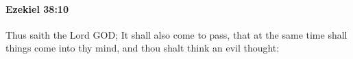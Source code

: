 
		\paragraph{Ezekiel 38:10} %
			\label{EZEKIEL-38-10}

			Thus saith the Lord GOD; It shall also come to pass, that at the same time shall things come into thy mind, and thou shalt think an evil thought:


